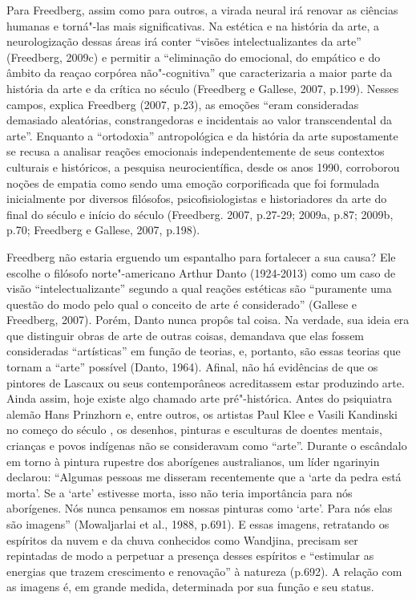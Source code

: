 Para Freedberg, assim como para outros, a virada neural irá renovar as
ciências humanas e torná"-las mais significativas. Na estética e na
história da arte, a neurologização dessas áreas irá conter ``visões
intelectualizantes da arte'' (Freedberg, 2009c) e permitir a
``eliminação do emocional, do empático e do âmbito da reaçao corpórea
não"-cognitiva'' que caracterizaria a maior parte da história da arte e
da crítica no século  (Freedberg e Gallese, 2007, p.199). Nesses
campos, explica Freedberg (2007, p.23), as emoções ``eram consideradas
demasiado aleatórias, constrangedoras e incidentais ao valor
transcendental da arte''. Enquanto a ``ortodoxia'' antropológica e da
história da arte supostamente se recusa a analisar reações emocionais
independentemente de seus contextos culturais e históricos, a pesquisa
neurocientífica, desde os anos 1990, corroborou noções de empatia como
sendo uma emoção corporificada que foi formulada inicialmente por
diversos filósofos, psicofisiologistas e historiadores da arte do final
do século  e início do século  (Freedberg. 2007, p.27-29; 2009a,
p.87; 2009b, p.70; Freedberg e Gallese, 2007, p.198).

Freedberg não estaria erguendo um espantalho para fortalecer a sua
causa? Ele escolhe o filósofo norte"-americano Arthur Danto (1924-2013)
como um caso de visão ``intelectualizante'' segundo a qual reações
estéticas são ``puramente uma questão do modo pelo qual o conceito de
arte é considerado'' (Gallese e Freedberg, 2007). Porém, Danto nunca
propôs tal coisa. Na verdade, sua ideia era que distinguir obras de arte
de outras coisas, demandava que elas fossem consideradas ``artísticas''
em função de teorias, e, portanto, são essas teorias que tornam a
``arte'' possível (Danto, 1964). Afinal, não há evidências de que os
pintores de Lascaux ou seus contemporâneos acreditassem estar produzindo
arte. Ainda assim, hoje existe algo chamado arte pré"-histórica. Antes do
psiquiatra alemão Hans Prinzhorn e, entre outros, os artistas Paul Klee
e Vasili Kandinski no começo do século , os desenhos, pinturas e
esculturas de doentes mentais, crianças e povos indígenas não se
consideravam como ``arte''. Durante o escândalo em torno à pintura
rupestre dos aborígenes australianos, um líder ngarinyin declarou:
``Algumas pessoas me disseram recentemente que a `arte da pedra está
morta'. Se a `arte' estivesse morta, isso não teria importância para nós
aborígenes. Nós nunca pensamos em nossas pinturas como `arte'. Para nós
elas são imagens'' (Mowaljarlai et al., 1988, p.691). E essas imagens,
retratando os espíritos da nuvem e da chuva conhecidos como Wandjina,
precisam ser repintadas de modo a perpetuar a presença desses espíritos
e ``estimular as energias que trazem crescimento e renovação'' à
natureza (p.692). A relação com as imagens é, em grande medida,
determinada por sua função e seu status.

